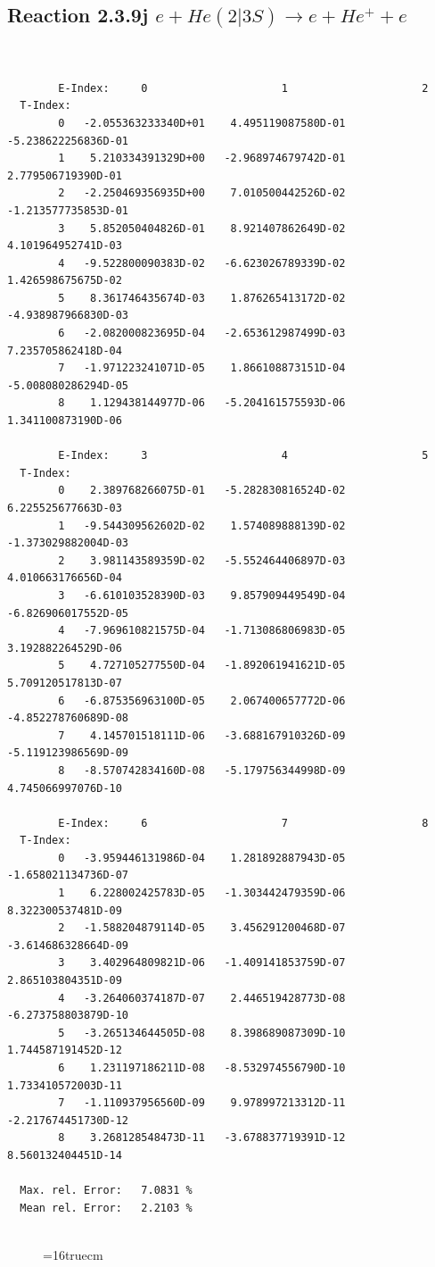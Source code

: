 \documentclass[12pt,dvips]{article}
\begin{document}
\subsection{
Reaction 2.3.9j  $e + He(2|3S) \rightarrow e + He^+ + e $
}



\begin{small}\begin{verbatim}


        E-Index:     0                     1                     2
  T-Index:
        0   -2.055363233340D+01    4.495119087580D-01   -5.238622256836D-01
        1    5.210334391329D+00   -2.968974679742D-01    2.779506719390D-01
        2   -2.250469356935D+00    7.010500442526D-02   -1.213577735853D-01
        3    5.852050404826D-01    8.921407862649D-02    4.101964952741D-03
        4   -9.522800090383D-02   -6.623026789339D-02    1.426598675675D-02
        5    8.361746435674D-03    1.876265413172D-02   -4.938987966830D-03
        6   -2.082000823695D-04   -2.653612987499D-03    7.235705862418D-04
        7   -1.971223241071D-05    1.866108873151D-04   -5.008080286294D-05
        8    1.129438144977D-06   -5.204161575593D-06    1.341100873190D-06

        E-Index:     3                     4                     5
  T-Index:
        0    2.389768266075D-01   -5.282830816524D-02    6.225525677663D-03
        1   -9.544309562602D-02    1.574089888139D-02   -1.373029882004D-03
        2    3.981143589359D-02   -5.552464406897D-03    4.010663176656D-04
        3   -6.610103528390D-03    9.857909449549D-04   -6.826906017552D-05
        4   -7.969610821575D-04   -1.713086806983D-05    3.192882264529D-06
        5    4.727105277550D-04   -1.892061941621D-05    5.709120517813D-07
        6   -6.875356963100D-05    2.067400657772D-06   -4.852278760689D-08
        7    4.145701518111D-06   -3.688167910326D-09   -5.119123986569D-09
        8   -8.570742834160D-08   -5.179756344998D-09    4.745066997076D-10

        E-Index:     6                     7                     8
  T-Index:
        0   -3.959446131986D-04    1.281892887943D-05   -1.658021134736D-07
        1    6.228002425783D-05   -1.303442479359D-06    8.322300537481D-09
        2   -1.588204879114D-05    3.456291200468D-07   -3.614686328664D-09
        3    3.402964809821D-06   -1.409141853759D-07    2.865103804351D-09
        4   -3.264060374187D-07    2.446519428773D-08   -6.273758803879D-10
        5   -3.265134644505D-08    8.398689087309D-10    1.744587191452D-12
        6    1.231197186211D-08   -8.532974556790D-10    1.733410572003D-11
        7   -1.110937956560D-09    9.978997213312D-11   -2.217674451730D-12
        8    3.268128548473D-11   -3.678837719391D-12    8.560132404451D-14

  Max. rel. Error:   7.0831 %
  Mean rel. Error:   2.2103 %


\end{verbatim}\end{small}
\begin{figure} \label{2.3.9j}
\epsfxsize=16truecm
\end{figure}
\newpage
\end{document}
